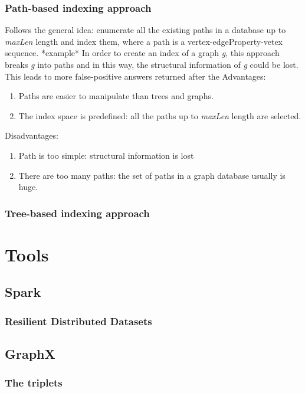 \documentclass{l4proj}
\theoremstyle{definition}
\begin{document}
        \subsection{Path-based indexing approach}
        Follows the general idea: enumerate all the existing paths in a database up to \textit{maxLen} length and index them, where a path is a vertex-edgeProperty-vetex sequence. *example*
        In order to create an index of a graph \textit{g}, this approach breaks \textit{g} into paths and in this way, the structural information of \textit{g} could be lost. This leads to more false-positive answers returned after the   
        Advantages:
        \begin{enumerate}
            \item Paths are easier to manipulate than trees and graphs.
            \item The index space is predefined: all the paths up to             \textit{maxLen} length are selected.
        \end{enumerate}
        
        Disadvantages:
        \begin{enumerate}
            \item Path is too simple: structural information is lost
            \item There are too many paths: the set of paths in a graph database usually is huge.
        \end{enumerate}
        
        
        \subsection{Tree-based indexing approach}
        
\chapter{Tools}
    \section{Spark}
        \subsection{Resilient Distributed Datasets}
    \section{GraphX}
        \subsection{The triplets}
\end{document}
